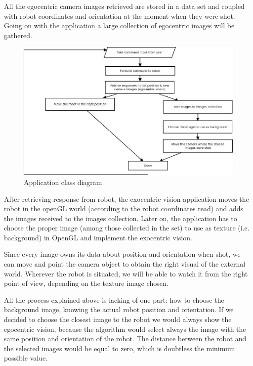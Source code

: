 %
All the egocentric camera images retrieved are stored in a data set and coupled
with robot coordinates and orientation at the moment when they were shot. Going
on with the application a large collection of egocentric images will be gathered.
%
\begin{figure}[!h]
  \begin{center}
    \includegraphics[width=400pt]{img/overall_diagram.jpeg}  %
    \caption{Application class diagram}
    \label{fig:overall_diagram}
  \end{center}
\end{figure}
%
After retrieving response from robot, the exocentric vision application moves the
robot in the openGL world (according to the robot coordinates read) and adds the
images received to the images collection. Later on, the application has to choose
the proper image (among those collected in the set) to use as texture (i.e. background)
in OpenGL and implement the exocentric vision.
%

%
Since every image owns its data about position and orientation when shot, we can
move and point the camera object to obtain the right visual of the external world.
Wherever the robot is situated, we will be able to watch it from the right point of view,
depending on the texture image chosen.
%

%
All the process explained above is lacking of one part: how to choose the background image,
knowing the actual robot position and orientation. If we decided to choose the closest image
to the robot we would always show the egocentric vision, because the algorithm would select
always the image with the same position and orientation of the robot. The distance between
the robot and the selected images would be equal to zero, which is doubtless the minimum possible
value.
%

